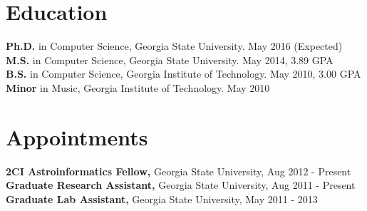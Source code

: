\documentclass{res}
\begin{document}
\begin{resume} 

\section{Education}          
    
{\bf Ph.D.} in Computer Science, Georgia State University. May 2016 (Expected)\\
{\bf M.S.} in Computer Science, Georgia State University. May 2014, 3.89 GPA \\
{\bf B.S.} in Computer Science, Georgia Institute of Technology. May 2010, 3.00 GPA\\
{\bf Minor} in Music, Georgia Institute of Technology. May 2010
	
\section{Appointments}
{\bf 2CI Astroinformatics Fellow,} Georgia State University, Aug 2012 - Present\\
{\bf Graduate Research Assistant,} Georgia State University, Aug 2011 - Present\\
{\bf Graduate Lab Assistant,} Georgia State University, May 2011 - 2013


\end{resume}
\end{document}
